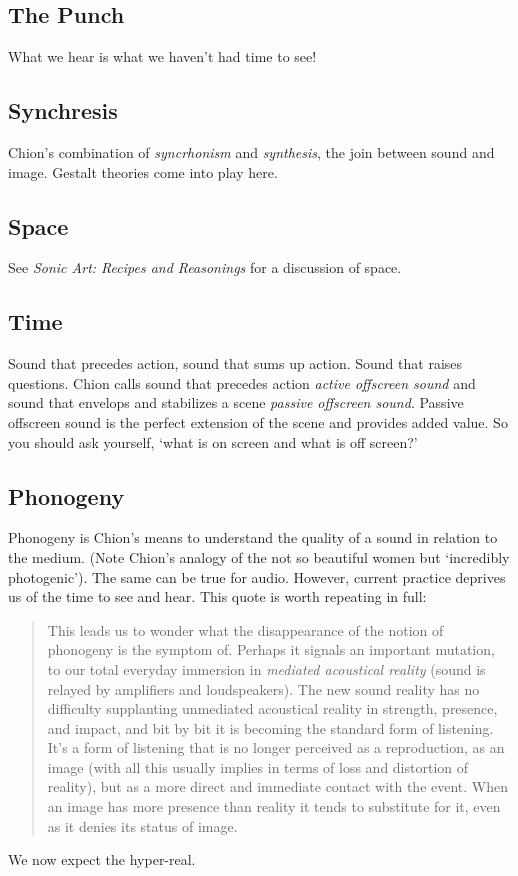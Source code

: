 \subsection{The Punch}
What we hear is what we haven't had time to see! \citep[61]{chion1990}

\subsection{Synchresis}
Chion's combination of \textit{syncrhonism} and \textit{synthesis}, the join between sound and image. Gestalt theories come into play here. 

\subsection{Space}
See \textit{Sonic Art: Recipes and Reasonings} for a discussion of space.  

\subsection{Time}
Sound that precedes action, sound that sums up action. Sound that raises questions.
Chion calls sound that precedes action \textit{active offscreen sound} and sound that envelops and stabilizes a scene \textit{passive offscreen sound}. Passive offscreen sound is the perfect extension of the scene and provides added value.
So you should ask yourself, `what is on screen and what is off screen?'

\subsection{Phonogeny}
Phonogeny is Chion's means to understand the quality of a sound \citep[101]{chion1990} in relation to the medium. (Note Chion's analogy of the not so beautiful women but `incredibly photogenic'). The same can be true for audio. However, current practice deprives us of the time to see and hear. This quote is worth repeating in full:

\begin{quotation}
This leads us to wonder what the disappearance of the notion of phonogeny is the symptom of. Perhaps it signals an important mutation, to our total everyday immersion in \textit{mediated acoustical reality} (sound is relayed by amplifiers and loudspeakers). The new sound reality has no difficulty supplanting unmediated acoustical reality in strength, presence, and impact, and bit by bit it is becoming the standard form of listening. It's a form of listening that is no longer perceived as a reproduction, as an image (with all this usually implies in terms of loss and distortion of reality), but as a more direct and immediate contact with the event. When an image has more presence than reality it tends to substitute for it, even as it denies its status of image.

\end{quotation}

We now expect the hyper-real. 



